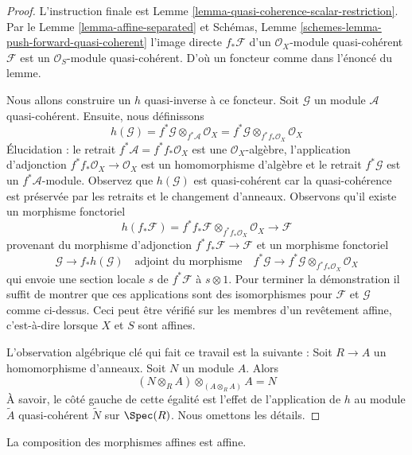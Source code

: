 \begin{proof}
L'instruction finale est Lemme \ref{lemma-quasi-coherence-scalar-restriction}. Par le Lemme \ref{lemma-affine-separated}
et Schémas, Lemme \ref{schemes-lemma-push-forward-quasi-coherent}
l'image directe $f_*\mathcal{F}$ d'un $\mathcal{O}_X$-module
quasi-cohérent $\mathcal{F}$ est un $\mathcal{O}_S$-module
quasi-cohérent.
D'où un foncteur comme dans
l'énoncé du lemme.

\medskip\noindent Nous
allons construire un $h$ quasi-inverse à ce foncteur. Soit $\mathcal{G}$ un
module $\mathcal{A}$ quasi-cohérent. Ensuite, nous définissons
$$
h(\mathcal{G}) = f^*\mathcal{G} \otimes_{f^*\mathcal{A}} \mathcal{O}_X =
f^*\mathcal{G} \otimes_{f^*f_*\mathcal{O}_X} \mathcal{O}_X
$$
Élucidation : le retrait $f^*\mathcal{A} = f^*f_*\mathcal{O}_X$ est une $\mathcal{O}_X$-algèbre,
l'application d'adjonction $f^*f_*\mathcal{O}_X \to \mathcal{O}_X$ est
un homomorphisme d'algèbre et le retrait $f^*\mathcal{G}$ est un $f^*\mathcal{A}$-module.
Observez que $h(\mathcal{G})$ est quasi-cohérent car la quasi-cohérence
est préservée par les retraits et le changement
d'anneaux. Observons qu'il existe un morphisme fonctoriel
$$
h(f_*\mathcal{F}) =
f^*f_*\mathcal{F} \otimes_{f^*f_*\mathcal{O}_X} \mathcal{O}_X \to \mathcal{F}
$$
provenant du morphisme d'adjonction $f^*f_*\mathcal{F} \to \mathcal{F}$ et un morphisme
fonctoriel
$$
\mathcal{G} \to f_*h(\mathcal{G}) \quad\text{adjoint du morphisme}\quad
f^*\mathcal{G} \to f^*\mathcal{G} \otimes_{f^*f_*\mathcal{O}_X} \mathcal{O}_X
$$
qui envoie une section locale $s$ de $f^*\mathcal{F}$ à $s \otimes 1$. Pour terminer la
démonstration il suffit de montrer que ces applications sont des isomorphismes pour
$\mathcal{F}$ et $\mathcal{G}$ comme ci-dessus. Ceci peut être vérifié sur les membres d'un revêtement
affine, c'est-à-dire lorsque $X$ et $S$ sont affines.

\medskip\noindent L'observation
algébrique clé qui fait ce travail est la suivante : Soit
$R \to A$ un homomorphisme d'anneaux. Soit $N$ un module $A$. Alors
$$
(N \otimes_R A) \otimes_{(A \otimes_R A)} A = N
$$
À savoir, le côté gauche de cette égalité est l'effet de l'application de
$h$ au module $\widetilde{A}$ quasi-cohérent $\widetilde{N}$ sur $\Spec(R)$. Nous omettons
les détails.
\end{proof}

\begin{lemma}
\label{lemma-composition-affine}
La composition des morphismes affines est affine.
\end{lemma}

